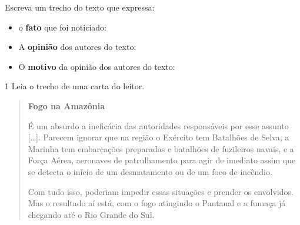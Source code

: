 \begin{escolha}
\begin{escolha}
\begin{escolha}
{\begin{quote}
\end{quote}

\begin{escolha}
\item Escreva um trecho do texto que expressa:


\begin{itemize}
\item o \textbf{fato} que foi noticiado: 

\item A \textbf{opinião} dos autores do texto: 
  
\item O \textbf{motivo} da opinião dos autores do texto: 
\end{itemize}

\end{escolha}


\num{1} Leia o trecho de uma carta do leitor.

\begin{quote}
\textbf{Fogo na Amazônia}

É um absurdo a ineficácia das autoridades responsáveis por esse assunto
{[}\ldots{}{]}. Parecem ignorar que na região o Exército tem Batalhões
de Selva, a Marinha tem embarcações preparadas e batalhões de fuzileiros
navais, e a Força Aérea, aeronaves de patrulhamento para agir de
imediato assim que se detecta o início de um desmatamento ou de um foco
de incêndio.

Com tudo isso, poderiam impedir essas situações e prender os envolvidos.
Mas o resultado aí está, com o fogo atingindo o Pantanal e a fumaça já
chegando até o Rio Grande do Sul.


\end{quote}}
\end{escolha}
\end{escolha}
\end{escolha}
